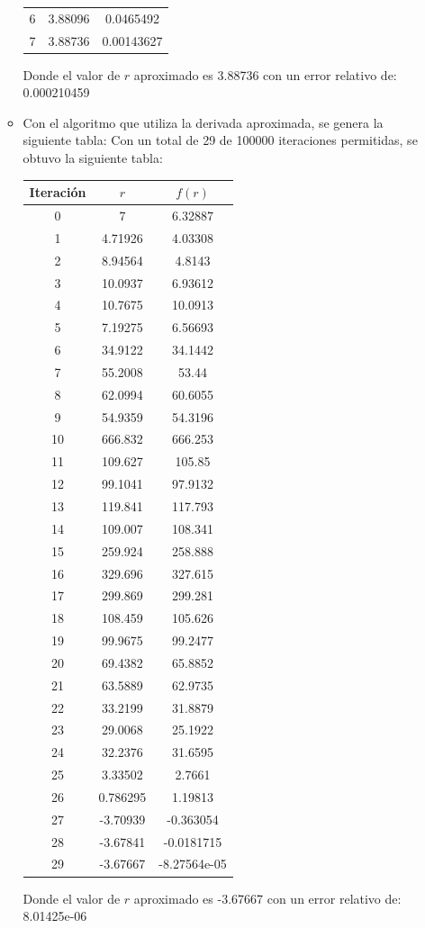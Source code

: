 \documentclass[10pt]{article}
\begin{document}
\begin{enumerate}
\begin{itemize}
\begin{center}
\begin{tabular}{|c|c|c|}
6&3.88096&0.0465492\\
7&3.88736&0.00143627\\
\hline
\end{tabular}
\end{center}
Donde el valor de $r$ aproximado es 3.88736 con un error relativo de: 0.000210459
 \item Con el algoritmo que utiliza la derivada aproximada, se genera la siguiente tabla:
 Con un total de 29 de 100000 iteraciones permitidas, se obtuvo la siguiente tabla:
\begin{center}
\begin{tabular}{|c|c|c|}
\hline
Iteraci\'on&$r$&$f(r)$\\
\hline
0&7&6.32887\\
1&4.71926&4.03308\\
2&8.94564&4.8143\\
3&10.0937&6.93612\\
4&10.7675&10.0913\\
5&7.19275&6.56693\\
6&34.9122&34.1442\\
7&55.2008&53.44\\
8&62.0994&60.6055\\
9&54.9359&54.3196\\
10&666.832&666.253\\
11&109.627&105.85\\
12&99.1041&97.9132\\
13&119.841&117.793\\
14&109.007&108.341\\
15&259.924&258.888\\
16&329.696&327.615\\
17&299.869&299.281\\
18&108.459&105.626\\
19&99.9675&99.2477\\
20&69.4382&65.8852\\
21&63.5889&62.9735\\
22&33.2199&31.8879\\
23&29.0068&25.1922\\
24&32.2376&31.6595\\
25&3.33502&2.7661\\
26&0.786295&1.19813\\
27&-3.70939&-0.363054\\
28&-3.67841&-0.0181715\\
29&-3.67667&-8.27564e-05\\
\hline
\end{tabular}
\end{center}
Donde el valor de $r$ aproximado es -3.67667 con un error relativo de: 8.01425e-06
\end{itemize}


\end{enumerate}
\end{document}
